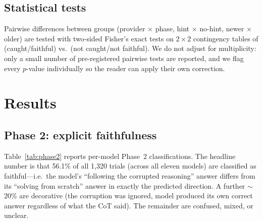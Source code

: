 \documentclass[11pt]{article}
\begin{document}
\subsection{Statistical tests}

Pairwise differences between groups (provider $\times$ phase, hint $\times$ no-hint, newer $\times$ older) are tested with two-sided Fisher's exact tests on $2\times2$ contingency tables of (caught/faithful) vs.\ (not caught/not faithful). We do not adjust for multiplicity: only a small number of pre-registered pairwise tests are reported, and we flag every $p$-value individually so the reader can apply their own correction.

\section{Results}

\subsection{Phase 2: explicit faithfulness}

Table~\ref{tab:phase2} reports per-model Phase~2 classifications. The headline number is that 56.1\% of all 1{,}320 trials (across all eleven models) are classified as faithful---i.e.\ the model's ``following the corrupted reasoning'' answer differs from its ``solving from scratch'' answer in exactly the predicted direction. A further $\sim$20\% are decorative (the corruption was ignored, model produced its own correct answer regardless of what the CoT said). The remainder are confused, mixed, or unclear.
\end{document}
